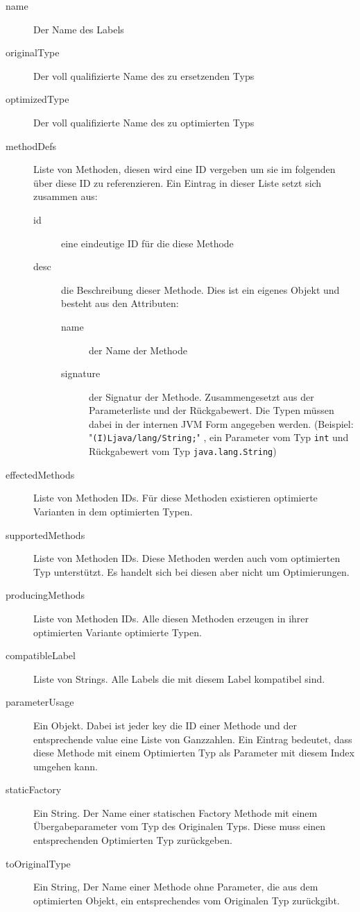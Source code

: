 \begin{description}
	\item[name] Der Name des Labels
	\item[originalType] Der voll qualifizierte Name des zu ersetzenden Typs
	\item[optimizedType] Der voll qualifizierte Name des zu optimierten Typs
	\item[methodDefs] Liste von Methoden, diesen wird eine ID vergeben um sie im 
	folgenden über diese ID zu referenzieren. Ein Eintrag in dieser Liste setzt
	sich zusammen aus:
	\begin{description}
		\item[id] eine eindeutige ID für die diese Methode
		\item[desc] die Beschreibung dieser Methode. Dies ist ein eigenes Objekt 
		und besteht aus den Attributen:
		\begin{description}
			\item[name] der Name der Methode
			\item[signature] der Signatur der Methode. Zusammengesetzt aus der
			Parameterliste und der Rückgabewert. Die Typen müssen dabei in der 
			internen JVM Form angegeben werden. (Beispiel: "\texttt{(I)Ljava/lang/String;}"
			, ein Parameter vom Typ \texttt{int} und Rückgabewert vom Typ
			\texttt{java.lang.String})
		\end{description}	
	\end{description}
	\item[effectedMethods] Liste von Methoden IDs. Für diese Methoden existieren 
	optimierte Varianten in dem optimierten Typen.
	\item[supportedMethods] Liste von Methoden IDs. Diese Methoden werden auch vom
	optimierten Typ unterstützt. Es handelt sich bei diesen aber nicht um Optimierungen.
	\item[producingMethods] Liste von Methoden IDs. Alle diesen Methoden erzeugen 
	in ihrer optimierten Variante optimierte Typen.
	\item[compatibleLabel] Liste von Strings. Alle Labels die mit diesem Label
	kompatibel sind.
	\item[parameterUsage] Ein Objekt. Dabei ist jeder key die ID einer Methode 
	und der entsprechende value eine Liste von Ganzzahlen. Ein Eintrag bedeutet, 
	dass diese Methode mit einem Optimierten Typ als Parameter mit diesem Index 
	umgehen kann. 
	\item[staticFactory] Ein String. Der Name einer statischen Factory Methode mit 
	einem Übergabeparameter vom Typ des Originalen Typs. Diese muss einen entsprechenden
	Optimierten Typ zurückgeben.
	\item[toOriginalType] Ein String, Der Name einer Methode ohne Parameter, die
	aus dem optimierten Objekt, ein entsprechendes vom Originalen Typ zurückgibt.

\end{description}

